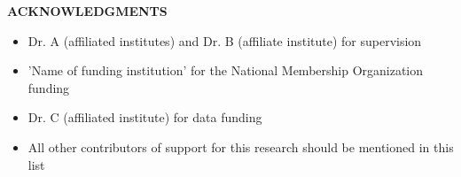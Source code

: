 
\begin{center}
	
	{\Large{\textbf{ACKNOWLEDGMENTS}}}
	
\end{center}

\begin{itemize}
	\item Dr. A (affiliated institutes) and Dr. B (affiliate institute) for supervision
	\item 'Name of funding institution' for the National Membership Organization funding
	\item Dr. C (affiliated institute) for data funding
	\item All other contributors of support for this research should be mentioned in this list
\end{itemize}